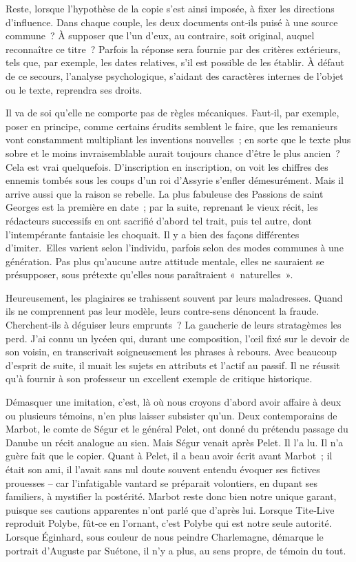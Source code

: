 \documentclass[french,twoside]{book} %
\begin{document}
\noindent Reste, lorsque l’hypothèse de la copie s’est ainsi imposée, à fixer les directions d’influence. Dans chaque couple, les deux documents ont‑ils puisé à une source commune ? À supposer que l’un d’eux, au contraire, soit original, auquel reconnaître ce titre ? Parfois la réponse sera fournie par des critères extérieurs, tels que, par exemple, les dates relatives, s’il est possible de les établir. À défaut de ce secours, l’analyse psycholo­gique, s’aidant des caractères internes de l’objet ou le texte, reprendra ses droits.\par
Il va de soi qu’elle ne comporte pas de règles mécaniques. Faut‑il, par exemple, poser en principe, comme certains érudits semblent le faire, que les remanieurs vont constamment multipliant les inventions nou­velles ; en sorte que le texte plus sobre et le moins invraisemblable aurait toujours chance d’être le plus ancien ? Cela est vrai quelquefois. D’ins­cription en inscription, on voit les chiffres des ennemis tombés sous les coups d’un roi d’Assyrie s’enfler démesurément. Mais il arrive aussi que la raison se rebelle. La plus fabuleuse des Passions de saint Georges est la première en date ; par la suite, reprenant le vieux récit, les rédacteurs  
\label{p56} successifs en ont sacrifié d’abord tel trait, puis tel autre, dont l’intempé­rante fantaisie les choquait. Il y a bien des façons différentes d’imiter. Elles varient selon l’individu, parfois selon des modes communes à une génération. Pas plus qu’aucune autre attitude mentale, elles ne sauraient se présupposer, sous prétexte qu’elles nous paraîtraient « naturelles ».\par
Heureusement, les plagiaires se trahissent souvent par leurs mala­dresses. Quand ils ne comprennent pas leur modèle, leurs contre‑sens dénoncent la fraude. Cherchent‑ils à déguiser leurs emprunts ? La gau­cherie de leurs stratagèmes les perd. J’ai connu un lycéen qui, durant une composition, l’œil fixé sur le devoir de son voisin, en transcrivait soigneusement les phrases à rebours. Avec beaucoup d’esprit de suite, il muait les sujets en attributs et l’actif au passif. Il ne réussit qu’à fournir à son professeur un excellent exemple de critique historique.\par
Démasquer une imitation, c’est, là où nous croyons d’abord avoir affaire à deux ou plusieurs témoins, n’en plus laisser subsister qu’un. Deux contemporains de Marbot, le comte de Ségur et le général Pelet, ont donné du prétendu passage du Danube un récit analogue au sien. Mais Ségur venait après Pelet. Il l’a lu. Il n’a guère fait que le copier. Quant à Pelet, il a beau avoir écrit avant Marbot ; il était son ami, il l’avait sans nul doute souvent entendu évoquer ses fictives prouesses – car l’infatigable vantard se préparait volontiers, en dupant ses familiers, à mystifier la postérité. Marbot reste donc bien notre unique garant, puisque ses cautions apparentes n’ont parlé que d’après lui. Lorsque Tite‑Live reproduit Polybe, fût‑ce en l’ornant, c’est Polybe qui est notre seule autorité. Lorsque Éginhard, sous couleur de nous peindre Charle­magne, démarque le portrait d’Auguste par Suétone, il n’y a plus, au sens propre, de témoin du tout.\par
\end{document}
